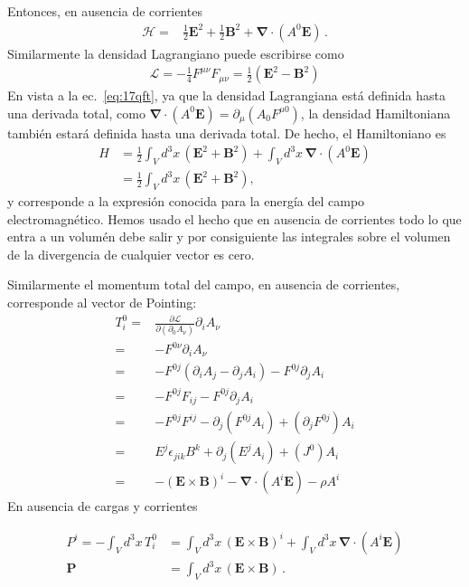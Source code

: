 Entonces, en ausencia de corrientes
\begin{align}
  \mathcal{H}=&\frac{1}{2}\mathbf{E}^2+\frac{1}{2}\mathbf{B}^2+\boldsymbol{\nabla}\cdot(A^0\mathbf{E})\,.
\end{align}
Similarmente la densidad Lagrangiano puede escribirse como
\begin{align}
   \mathcal{L}=-\frac{1}{4}F^{\mu\nu}F_{\mu\nu}=\frac{1}{2}\left(\mathbf{E}^2-\mathbf{B}^2\right)
\end{align}
En vista a la ec.~\eqref{eq:17qft}, ya que la densidad Lagrangiana está definida hasta una derivada total, como $\boldsymbol{\nabla}\cdot(A^0\mathbf{E})=\partial_\mu(A_0F^{\mu0})$, la densidad Hamiltoniana también estará definida hasta una derivada total. De hecho,
el Hamiltoniano es 
\begin{align}
  H&=\frac{1}{2}\int_Vd^3x\,(\mathbf{E}^2+\mathbf{B}^2)+ \int_Vd^3x\,\boldsymbol{\nabla}\cdot(A^0\mathbf{E})\nonumber\\
  \label{eq:18qft}
  &=\frac{1}{2}\int_Vd^3x\,(\mathbf{E}^2+\mathbf{B}^2),
\end{align}
y corresponde a la expresión conocida para la energía del campo electromagnético. Hemos usado el hecho que en ausencia de corrientes todo lo que entra a un volumén debe salir y por consiguiente las integrales sobre el volumen de la divergencia de cualquier vector es cero.

Similarmente el momentum total del
campo, en ausencia de corrientes, corresponde al vector de Pointing:
\begin{align}
  T^0_i=&\frac{\partial\mathcal{L}}{\partial(\partial_0 A_\nu)}\partial_i A_\nu\nonumber\\
  =&-F^{0\nu}\partial_i A_\nu\nonumber\\
  =&-F^{0j}(\partial_i A_j-\partial_j A_i)-F^{0j}\partial_j A_i\nonumber\\
  =&-F^{0j}F_{ij}-F^{0j}\partial_j A_i\nonumber\\
  =&-F^{0j}F^{ij}-\partial_j (F^{0j}A_i)+(\partial_jF^{0j}) A_i\nonumber\\
  =&E^{j}\epsilon_{jik}B^k+\partial_j (E^jA_i)+(J^0) A_i\nonumber\\
  =&-(\mathbf{E}\times \mathbf{B})^i-\boldsymbol{\nabla}\cdot(A^i\mathbf{E})-\rho A^i\,
\end{align}
En ausencia de cargas y corrientes

\begin{align}
 P^i=-\int_Vd^3x\,T_{i}^0&=\int_Vd^3x\,(\mathbf{E}\times \mathbf{B})^i+\int_Vd^3x\,\boldsymbol{\nabla}\cdot(A^i\mathbf{E})\nonumber\\
 \label{eq:19qft}
 \mathbf{P}&=\int_Vd^3x\,(\mathbf{E}\times \mathbf{B})\,.
\end{align}

